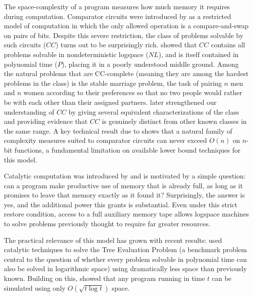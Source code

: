 \documentclass[12pt]{article}
\begin{document}
The space-complexity of a program measures how much memory it requires during computation. Comparator circuits were introduced by \textcite{Subramanian1990} as a restricted model of computation in which the only allowed operation is a compare-and-swap on pairs of bits. Despite this severe restriction, the class of problems solvable by such circuits ($CC$) turns out to be surprisingly rich. \textcite{MayrSubramanian1992} showed that $CC$ contains all problems solvable in nondeterministic logspace ($NL$), and is itself contained in polynomial time ($P$), placing it in a poorly understood middle ground. Among the natural problems that are CC-complete (meaning they are among the hardest problems in the class) is the stable marriage problem, the  task of pairing $n$ men and $n$ women according to their preferences so that no two people would rather be with each other than their assigned partners. \textcite{CookFilmusLe2014} later strengthened our understanding of $CC$ by giving several equivalent characterizations of the class and providing evidence that $CC$ is genuinely distinct from other known classes in the same range. A key technical result due to  \textcite{Razborov1992} shows that a natural family of complexity measures suited to comparator circuits can never exceed $O(n)$ on $n$-bit functions, a fundamental limitation on available lower bound techniques for this model.

Catalytic computation was introduced by \textcite{BuhrmanEtAl2014} and is motivated by a simple question: can a program make productive use of memory that is already full, as long as it promises to leave that memory exactly as it found it? Surprisingly, the answer is yes, and the additional power this grants is substantial. Even under this strict restore condition, access to a full auxiliary memory tape allows logspace machines to solve problems previously thought to require far greater resources. 

The practical relevance of this model has grown with recent results: \textcite{CookMertz2024} used catalytic techniques to solve the Tree Evaluation Problem (a benchmark problem central to the question of whether every problem solvable in polynomial time can also be solved in logarithmic space) using dramatically less space than previously known. Building on this, \textcite{Williams2025} showed that any program running in time $t$ can be simulated using only $O(\sqrt{t \log t})$ space.
\end{document}
